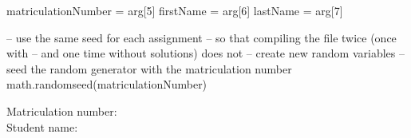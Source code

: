 \documentclass[a4paper]{exam}
\begin{document}
\begin{luacode*}
matriculationNumber = arg[5]
firstName = arg[6]
lastName = arg[7]

-- use the same seed for each assignment
-- so that compiling the file twice (once with
-- and one time without solutions) does not
-- create new random variables
-- seed the random generator with the matriculation number
math.randomseed(matriculationNumber)
\end{luacode*}

\noindent
Matriculation number: \\
Student name: 

\begin{questions}





\end{questions}
\end{document}

